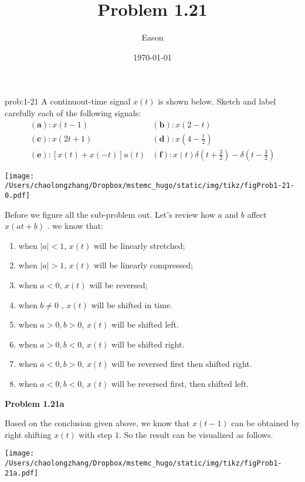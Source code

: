 \documentclass[koma,a4paper,utopia,12pt,listings-color,microtype,paralist,colorlinks,urlcolor=red]{org-article}
\author{Eason}
\date{\today}
\title{Problem 1.21}
\begin{document}
\begin{prob}[]{prob:1-21}
A continuout-time signal \(x(t)\) is shown below. Sketch and label carefully
each of the following signals:
\begin{equation*}
\begin{array}{ll}
\mathbf{(a)}: x(t-1) & \mathbf{(b)}: x(2-t) \\
\mathbf{(c)}: x(2t + 1) & \mathbf{(d)}: x(4-\frac{t}{2}) \\
\mathbf{(e)}: [x(t) + x(-t)] u(t) & \mathbf{(f)}: x(t)\delta(t +\frac{3}{2}) - \delta(t-\frac{3}{2})
\end{array}
\end{equation*}
\begin{center}
\texttt{[image: /Users/chaolongzhang/Dropbox/mstemc\_hugo/static/img/tikz/figProb1-21-0.pdf]}
\end{center}
\label{prob:1-21}
\end{prob}



Before we figure all the sub-problem out. Let's review how \(a\) and \(b\)
affect \(x(at+b)\) . we know that:

\begin{enumerate}
\item when \(|a| < 1\), \(x(t)\) will be linearly stretched;
\item when \(|a|>1\), \(x(t)\) will be linearly compressed;
\item when \(a < 0\), \(x(t)\) will be reversed;
\item when \(b\neq 0\) , \(x(t)\) will be shifted in time.
\item when \(a>0, b>0\), \(x(t)\) will be shifted left.
\item when \(a>0,b<0\), \(x(t)\) will be shifted right.
\item when \(a<0,b>0\), \(x(t)\) will be reversed first then shifted right.
\item when \(a<0,b<0\), \(x(t)\) will be reversed first, then shifted left.
\end{enumerate}

\textbf{Problem 1.21a}

Based on the conclusion given above, we know that \(x(t-1)\) can be obtained by right
shifting \(x(t)\) with step \(1\). So the result can be visualized as follows.


\begin{center}
\texttt{[image: /Users/chaolongzhang/Dropbox/mstemc\_hugo/static/img/tikz/figProb1-21a.pdf]}
\end{center}
\end{document}
